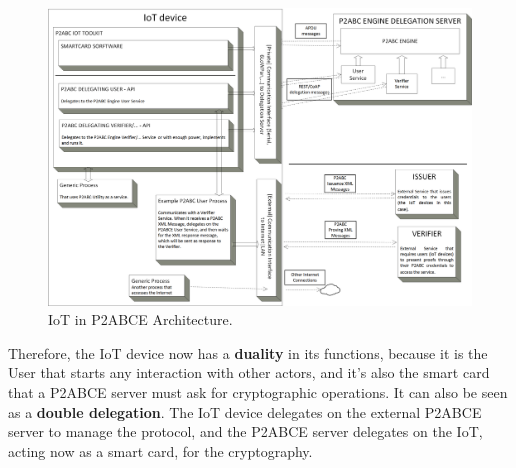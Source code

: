 \begin{figure}[bth]
	\begin{center}
		\includegraphics[width=\linewidth]{gfx/P2ABCE-IoT-bw}
	\end{center}
	\caption{IoT in P2ABCE Architecture.}
	\label{fig:P2ABCE-IoT}
\end{figure}


\hfil


Therefore, the IoT device now has a \textbf{duality} in its functions, because it is the User that starts any interaction with other actors, and it's also the smart card that a P2ABCE server must ask for cryptographic operations. It can also be seen as a \textbf{double delegation}. The IoT device delegates on the external P2ABCE server to manage the protocol, and the P2ABCE server delegates on the IoT, acting now as a smart card, for the cryptography.





